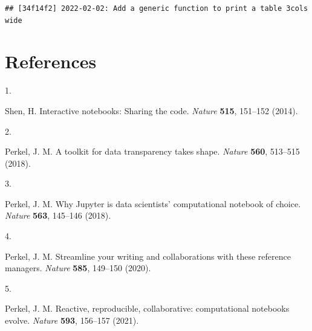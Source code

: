 \documentclass[smallextended]{svjour3}       %
\newlength{\cslhangindent}
\newlength{\csllabelwidth}
\newlength{\cslentryspacingunit} %
\newenvironment{CSLReferences}[2] %
 {%
  \setlength{\parindent}{0pt}
  \ifodd #1
  \let\oldpar\par
  \def\par{\hangindent=\cslhangindent\oldpar}
  \fi
  \setlength{\parskip}{#2\cslentryspacingunit}
 }%
 {}
\newcommand{\CSLLeftMargin}[1]{\parbox[t]{\csllabelwidth}{#1}}
\newcommand{\CSLRightInline}[1]{\parbox[t]{\linewidth - \csllabelwidth}{#1}\break}
\begin{document}
\begin{verbatim}
## [34f14f2] 2022-02-02: Add a generic function to print a table 3cols wide
\end{verbatim}

\hypertarget{references}{%
\section*{References}\label{references}}

\hypertarget{refs}{}
\begin{CSLReferences}{0}{0}
\leavevmode\hypertarget{ref-shen2014}{}%
\CSLLeftMargin{1. }
\CSLRightInline{Shen, H. Interactive notebooks: Sharing the code. \emph{Nature} \textbf{515}, 151--152 (2014).}

\leavevmode\hypertarget{ref-perkel2018a}{}%
\CSLLeftMargin{2. }
\CSLRightInline{Perkel, J. M. A toolkit for data transparency takes shape. \emph{Nature} \textbf{560}, 513--515 (2018).}

\leavevmode\hypertarget{ref-perkel2018}{}%
\CSLLeftMargin{3. }
\CSLRightInline{Perkel, J. M. Why Jupyter is data scientists{'} computational notebook of choice. \emph{Nature} \textbf{563}, 145--146 (2018).}

\leavevmode\hypertarget{ref-perkel2020}{}%
\CSLLeftMargin{4. }
\CSLRightInline{Perkel, J. M. Streamline your writing {{}} and collaborations {{}} with these reference managers. \emph{Nature} \textbf{585}, 149--150 (2020).}

\leavevmode\hypertarget{ref-perkel2021}{}%
\CSLLeftMargin{5. }
\CSLRightInline{Perkel, J. M. Reactive, reproducible, collaborative: computational notebooks evolve. \emph{Nature} \textbf{593}, 156--157 (2021).}

\end{CSLReferences}




\end{document}
